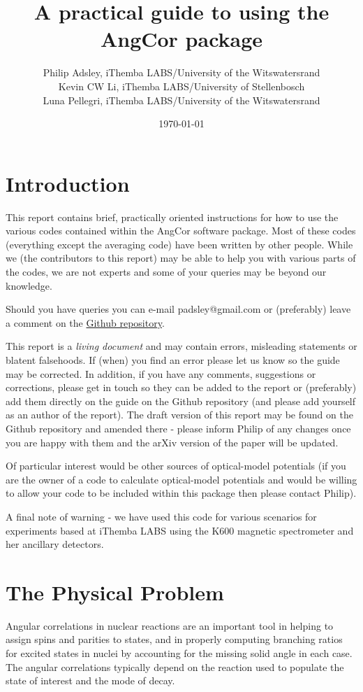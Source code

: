 \documentclass[a4paper,10pt]{article}
\title{A practical guide to using the AngCor package}
\author{Philip Adsley, iThemba LABS/University of the Witswatersrand\\
Kevin CW Li, iThemba LABS/University of Stellenbosch\\
Luna Pellegri, iThemba LABS/University of the Witswatersrand}
\date{\today}
\begin{document}
\lstset{language=bash}
\maketitle

\section{Introduction}

This report contains brief, practically oriented instructions for how to use the various codes contained within the AngCor software package. Most of these codes (everything except the averaging code) have been written by other people. While we (the contributors to this report) may be able to help you with various parts of the codes, we are not experts and some of your queries may be beyond our knowledge.

Should you have queries you can e-mail padsley@gmail.com or (preferably) leave a comment on the \href{https://github.com/padsley/AngCorPackage}{Github repository}.

This report is a {\it living document} and may contain errors, misleading statements or blatent falsehoods. If (when) you find an error please let us know so the guide may be corrected. In addition, if you have any comments, suggestions or corrections, please get in touch so they can be added to the report or (preferably) add them directly on the guide on the Github repository (and please add yourself as an author of the report). The draft version of this report may be found on the Github repository and amended there - please inform Philip of any changes once you are happy with them and the arXiv version of the paper will be updated.

Of particular interest would be other sources of optical-model potentials (if you are the owner of a code to calculate optical-model potentials and would be willing to allow your code to be included within this package then please contact Philip).

A final note of warning - we have used this code for various scenarios for experiments based at iThemba LABS using the K600 magnetic spectrometer and her ancillary detectors. 

\section{The Physical Problem}

Angular correlations in nuclear reactions are an important tool in helping to assign spins and parities to states, and in properly computing branching ratios for excited states in nuclei by accounting for the missing solid angle in each case. The angular correlations typically depend on the reaction used to populate the state of interest and the mode of decay.
\end{document}
